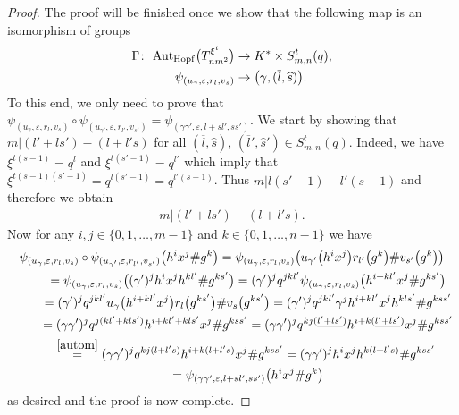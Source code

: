 \documentclass[pdftex]{sigma}
\numberwithin{equation}{section}
\begin{document}
\begin{proof}
The proof will be finished once we show that the following map is an isomorphism of groups
\begin{align*}
\Gamma\colon \ {\rm Aut} _{\rm Hopf}\big(T_{nm^{2}}^ {\xi^{t}}\big) & \to K^{*}\times S^{t}_{m, n}(q), \\
 \psi_{(u_{\gamma}, \varepsilon, r_{l}, v_{s})} & \to \big(\gamma, (\overline{l}, \widehat{s})\big).
\end{align*}
To this end, we only need to prove that $\psi_{(u_{\gamma}, \varepsilon, r_{l}, v_{s})} \circ \psi_{(u_{\gamma '}, \varepsilon, r_{l'}, v_{s'})} = \psi_{(\gamma \gamma ', \varepsilon, l + sl' , ss')}$. We start by showing that $m | (l' + ls') - (l + l's)$ for all $(\overline{l}, \widehat{s})$, $(\overline{l}', \widehat{s}') \in S^{t}_{m, n}(q)$. Indeed, we have $\xi^{t(s-1)} = q^{l}$ and $\xi^{t(s'-1)} = q^{l'}$ which imply that $\xi^{t(s-1)(s'-1)} = q^{l(s'-1)} = q^{l'(s-1)}$. Thus $m | l(s'-1) - l'(s-1)$ and therefore we obtain
\begin{gather}\label{autom}
m | (l' + ls') - (l + l's).
\end{gather}
Now for any $i, j \in \{0, 1,\dots, m-1\}$ and $k \in \{0, 1,\dots, n-1\}$ we have
\begin{gather*}
\psi_{(u_{\gamma}, \varepsilon, r_{l}, v_{s})} \circ \psi_{(u_{\gamma '}, \varepsilon, r_{l'}, v_{s'})}\big(h^{i}
x^{j} \# g^{k}\big) = \psi_{(u_{\gamma}, \varepsilon, r_{l}, v_{s})}\big(u_{\gamma '}\big(h^{i}
x^{j}\big) r_{l'}\big(g^{k}\big) \# v_{s'}\big(g^{k}\big) \big) \\
\qquad \ {} =\psi_{(u_{\gamma}, \varepsilon, r_{l}, v_{s})}\big((\gamma')^{j} h^{i} x^{j}
h^{kl'} \# g^{ks'}\big) = (\gamma')^{j} q^{jkl'} \psi_{(u_{\gamma}, \varepsilon, r_{l}, v_{s})}
\big(h^{i+kl'} x^{j} \# g^{ks'}\big) \\
\qquad \ {} = (\gamma')^{j} q^{jkl'} u_{\gamma}\big(h^{i+kl'} x^{j}\big) r_{l}\big(g^{ks'}\big)
 \# v_{s}\big(g^{ks'}\big) =(\gamma')^{j} q^{jkl'} \gamma^{j} h^{i+kl'} x^{j} h^{kls'} \# g^{kss'} \nonumber\\
\qquad \ {} =(\gamma \gamma')^{j} q^{j(kl' + kls')} h^{i + kl' + kls'} x^{j} \# g^{kss'}
 =(\gamma \gamma')^{j} q^{kj(\underline{l' + ls'})} h^{i + k(\underline{l' + ls'})} x^{j} \# g^{kss'} \\
 \qquad {} \stackrel{\eqref{autom}} {=} (\gamma \gamma')^{j} q^{kj(l +
l's)} h^{i + k(l + l's)} x^{j} \# g^{kss'}
 = (\gamma \gamma')^{j} h^{i} x^{j} h^{k(l + l's)} \# g^{kss'} \\
 \qquad \ {} = \psi_{(\gamma \gamma ', \varepsilon, l + sl', ss')}\big(h^{i} x^{j} \# g^{k}\big)
\end{gather*}
as desired and the proof is now complete.
\end{proof}
\end{document}
